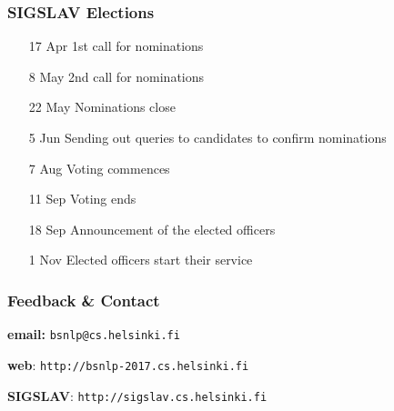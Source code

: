 \documentclass{beamer}
\begin{document}
\begin{frame}[fragile]
 \frametitle{SIGSLAV Elections}

\begin{itemize}

	\item[17 Apr] 1st call for nominations

	\item[8 May] 2nd call for nominations

	\item[22 May] Nominations close

	\item[5 Jun] Sending out queries to candidates to confirm nominations

	\item[7 Aug] Voting commences

	\item[11 Sep] Voting ends

	\item[18 Sep] Announcement of the elected officers

	\item[1 Nov] Elected officers start their service
\end{itemize}

\end{frame}



\begin{frame}[fragile]
 \frametitle{Feedback \& Contact}

\textbf{email:} {\color{blue} \large{\verb+bsnlp@cs.helsinki.fi+}}

\vspace{1cm}

\textbf{web}: {\color{blue} \large{\verb+http://bsnlp-2017.cs.helsinki.fi+}}

\vspace{1cm}

\textbf{SIGSLAV}: {\color{blue} \large{\verb+http://sigslav.cs.helsinki.fi+}}


\end{frame}
\end{document}
